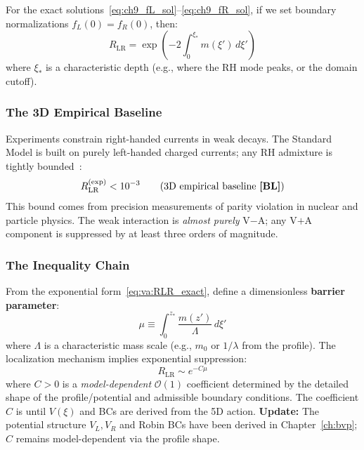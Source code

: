 For the exact solutions~\eqref{eq:ch9_fL_sol}--\eqref{eq:ch9_fR_sol}, if we set
boundary normalizations $f_L(0) = f_R(0)$, then:
\begin{equation}
    R_{\text{LR}} = \exp\left(-2\int_0^{\xi_*} m(\xi')\,d\xi'\right)
    \label{eq:va:RLR_exact}
\end{equation}
where $\xi_*$ is a characteristic depth (e.g., where the RH mode peaks, or the
domain cutoff).

\subsubsection{The 3D Empirical Baseline}

Experiments constrain right-handed currents in weak decays. The Standard Model
is built on purely left-handed charged currents; any RH admixture is tightly
bounded~\cite{PDG2024}:
\begin{equation}
    R_{\text{LR}}^{\text{(exp)}} < 10^{-3}
    \qquad \text{(3D empirical baseline \textbf{[BL]}{})}
    \label{eq:va:empirical_bound}
\end{equation}
This bound comes from precision measurements of parity violation in nuclear
and particle physics. The weak interaction is \emph{almost purely} V$-$A;
any V$+$A component is suppressed by at least three orders of magnitude.

\subsubsection{The Inequality Chain}

From the exponential form~\eqref{eq:va:RLR_exact}, define a dimensionless
\textbf{barrier parameter}:
\begin{equation}
    \mu \equiv \int_0^{z_*} \frac{m(z')}{\Lambda}\,d\xi'
    \label{eq:va:mu_def}
\end{equation}
where $\Lambda$ is a characteristic mass scale (e.g., $m_0$ or $1/\lambda$ from
the profile). The localization mechanism implies exponential suppression:
\begin{equation}
    R_{\text{LR}} \sim e^{-C\mu}
    \label{eq:va:RLR_mu}
\end{equation}
where $C > 0$ is a \emph{model-dependent} $\mathcal{O}(1)$ coefficient determined
by the detailed shape of the profile/potential and admissible boundary conditions.
The coefficient $C$ is \tagOPEN{} until $V(\xi)$ and BCs are derived from the 5D action.
\textbf{Update:} The potential structure $V_L, V_R$ and Robin BCs have been derived in
Chapter~\ref{ch:bvp}; $C$ remains model-dependent via the profile shape.

